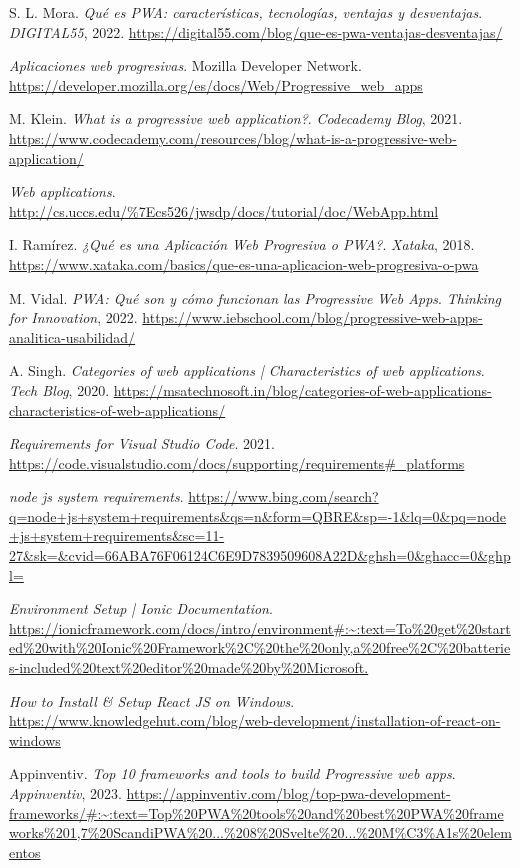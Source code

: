 \documentclass{IEEEtran}
\begin{document}
\begin{thebibliography}{99}
	
	S. L. Mora.
	\emph{Qué es PWA: características, tecnologías, ventajas y desventajas}.
	\emph{DIGITAL55}, 2022.
	\url{https://digital55.com/blog/que-es-pwa-ventajas-desventajas/}
	
	\emph{Aplicaciones web progresivas}.
	Mozilla Developer Network.
	\url{https://developer.mozilla.org/es/docs/Web/Progressive_web_apps}
	
	M. Klein.
	\emph{What is a progressive web application?}.
	\emph{Codecademy Blog}, 2021.
	\url{https://www.codecademy.com/resources/blog/what-is-a-progressive-web-application/}
	
	\emph{Web applications}.
	\url{http://cs.uccs.edu/%7Ecs526/jwsdp/docs/tutorial/doc/WebApp.html}
	
	I. Ramírez.
	\emph{¿Qué es una Aplicación Web Progresiva o PWA?}.
	\emph{Xataka}, 2018.
	\url{https://www.xataka.com/basics/que-es-una-aplicacion-web-progresiva-o-pwa}
	
	M. Vidal.
	\emph{PWA: Qué son y cómo funcionan las Progressive Web Apps}.
	\emph{Thinking for Innovation}, 2022.
	\url{https://www.iebschool.com/blog/progressive-web-apps-analitica-usabilidad/}
	
	A. Singh.
	\emph{Categories of web applications | Characteristics of web applications}.
	\emph{Tech Blog}, 2020.
	\url{https://msatechnosoft.in/blog/categories-of-web-applications-characteristics-of-web-applications/}
	
	\emph{Requirements for Visual Studio Code}.
	2021.
	\url{https://code.visualstudio.com/docs/supporting/requirements#_platforms}
	
	\emph{node js system requirements}.
	\url{https://www.bing.com/search?q=node+js+system+requirements&qs=n&form=QBRE&sp=-1&lq=0&pq=node+js+system+requirements&sc=11-27&sk=&cvid=66ABA76F06124C6E9D7839509608A22D&ghsh=0&ghacc=0&ghpl=}
	
	\emph{Environment Setup | Ionic Documentation}.
	\url{https://ionicframework.com/docs/intro/environment#:~:text=To%20get%20started%20with%20Ionic%20Framework%2C%20the%20only,a%20free%2C%20batteries-included%20text%20editor%20made%20by%20Microsoft.}
	
	\emph{How to Install \& Setup React JS on Windows}.
	\url{https://www.knowledgehut.com/blog/web-development/installation-of-react-on-windows}
	
	Appinventiv.
	\emph{Top 10 frameworks and tools to build Progressive web apps}.
	\emph{Appinventiv}, 2023.
	\url{https://appinventiv.com/blog/top-pwa-development-frameworks/#:~:text=Top%20PWA%20tools%20and%20best%20PWA%20frameworks%201,7%20ScandiPWA%20...%208%20Svelte%20...%20M%C3%A1s%20elementos}
	
\end{thebibliography}

	
\end{document}
